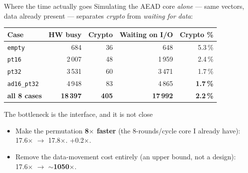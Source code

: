 \documentclass[aspectratio=169,11pt]{beamer}
\newcommand{\code}[1]{\texttt{\small #1}}
\begin{document}
\begin{frame}{Where the time actually goes}
\small Simulating the AEAD core \emph{alone} --- same vectors, data already
present --- separates \emph{crypto} from \emph{waiting for data}:
\begin{center}
{\footnotesize\setlength{\tabcolsep}{5pt}
\begin{tabular}{lrrrr}
\toprule
\textbf{Case} & \textbf{HW busy} & \textbf{Crypto} & \textbf{Waiting on I/O} & \textbf{Crypto \%}\\
\midrule
\code{empty}     & 684   & 36 & 648   & 5.3\,\%\\
\code{pt16}      & 2\,007 & 48 & 1\,959 & 2.4\,\%\\
\code{pt32}      & 3\,531 & 60 & 3\,471 & 1.7\,\%\\
\code{ad16\_pt32}& 4\,948 & 83 & 4\,865 & \textbf{1.7\,\%}\\
\midrule
\textbf{all 8 cases} & \textbf{18\,397} & \textbf{405} & \textbf{17\,992} & \textbf{2.2\,\%}\\
\bottomrule
\end{tabular}}
\end{center}
\vspace{1mm}
\begin{block}{The bottleneck is the interface, and it is not close}
\small
\begin{itemize}\small
\item Make the permutation \textbf{8$\times$ faster} (the 8-rounds/cycle core I
      already have): 17.6$\times$ $\rightarrow$ 17.8$\times$. \alert{+0.2$\times$.}
\item Remove the data-movement cost entirely (an upper bound, not a design):
      17.6$\times$ $\rightarrow$ \textbf{$\sim$1050$\times$}.
\end{itemize}
\end{block}
\end{frame}
\end{document}
